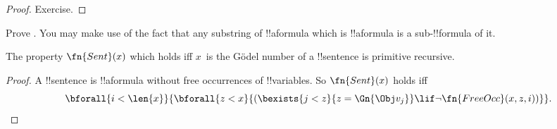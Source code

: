 \documentclass[../../../include/open-logic-section]{subfiles}
\begin{document}
\begin{proof}
Exercise.
\end{proof}

\begin{prob}
Prove .  You may make use
of the fact that any substring of !!a{formula} which is !!a{formula}
is a sub-!!{formula} of it.
\end{prob}

\begin{prop}
The property $\fn{Sent}(x)$ which holds iff $x$~is the G\"odel
number of a !!{sentence} is primitive recursive.
\end{prop}

\begin{proof}
A !!{sentence} is !!a{formula} without free occurrences of
!!{variable}s. So $\fn{Sent}(x)$ holds iff
\[
\bforall{i<\len{x}}{\bforall{z<x}{(\bexists{j<z}{z=\Gn{\Obj v_j}}
\lif \lnot\fn{FreeOcc}(x,z,i))}}.
\]
\end{proof}
\end{document}
